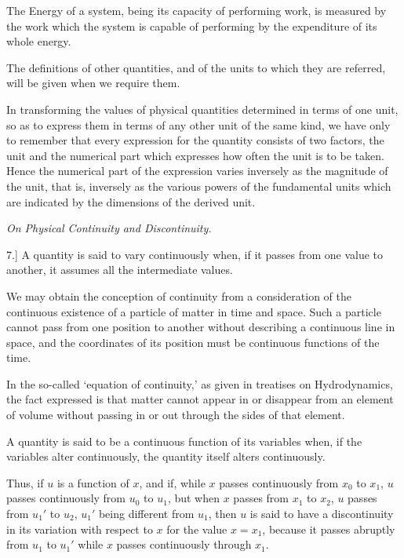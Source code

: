 \documentclass[11pt,a4paper]{article}
\begin{document}
The Energy of a system, being its capacity of performing work, is
measured by the work which the system is capable of performing by the
expenditure of its whole energy.

\clearpage

The definitions of other quantities, and of the units to which they are
referred, will be given when we require them.

In transforming the values of physical quantities determined in terms of
one unit, so as to express them in terms of any other unit of the same
kind, we have only to remember that every expression for the quantity
consists of two factors, the unit and the numerical part which expresses
how often the unit is to be taken. Hence the numerical part of the
expression varies inversely as the magnitude of the unit, that is,
inversely as the various powers of the fundamental units which are
indicated by the dimensions of the derived unit.

\begin{center}
\textit{On Physical Continuity and Discontinuity.}
\end{center}

7.] A quantity is said to vary continuously when, if it passes from one
value to another, it assumes all the intermediate values.

We may obtain the conception of continuity from a consideration of the
continuous existence of a particle of matter in time and space. Such a
particle cannot pass from one position to another without describing a
continuous line in space, and the coordinates of its position must be
continuous functions of the time.

In the so-called `equation of continuity,' as given in treatises on
Hydrodynamics, the fact expressed is that matter cannot appear in or
disappear from an element of volume without passing in or out through the
sides of that element.

A quantity is said to be a continuous function of its variables when, if
the variables alter continuously, the quantity itself alters
continuously.

Thus, if \(u\) is a function of \(x\), and if, while \(x\) passes
continuously from \(x_0\) to \(x_1\), \(u\) passes continuously from
\(u_0\) to \(u_1\), but when \(x\) passes from \(x_1\) to \(x_2\), \(u\)
passes from \(u_1'\) to \(u_2\), \(u_1'\) being different from \(u_1\),
then \(u\) is said to have a discontinuity in its variation with respect
to \(x\) for the value \(x=x_1\), because it passes abruptly from \(u_1\)
to \(u_1'\) while \(x\) passes continuously through \(x_1\).
\end{document}
